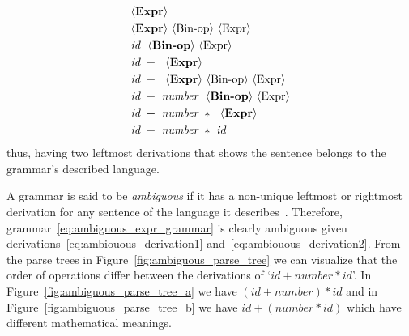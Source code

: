 \documentclass[
  oneside,
  english,
  coorientadorbanca,
  embeddedlogo,
  noabntexcite
]{ufsc-thesis-rn46-2019}
\newcommand{\bnfvar}[1]{\ \bnfvars{#1}}
\newcommand{\bnfvars}[1]{\langle\textrm{#1}\rangle}
\begin{document}
\begin{equation}\label{eq:ambiouous_derivation2}
  \begin{aligned}
     & \bnfvars{\textbf{Expr}}                                                  \\
     & \bnfvars{\textbf{Expr}}\bnfvar{Bin-op}\bnfvar{Expr}                      \\
     & \textit{id}\ \bnfvar{\textbf{Bin-op}}\bnfvar{Expr}                       \\
     & \textit{id}\ + \ \bnfvar{\textbf{Expr}}                                  \\
     & \textit{id}\ + \ \bnfvar{\textbf{Expr}}\bnfvar{Bin-op}\bnfvar{Expr}      \\
     & \textit{id}\ + \ \textit{number} \ \bnfvar{\textbf{Bin-op}}\bnfvar{Expr} \\
     & \textit{id}\ + \ \textit{number} \ * \ \bnfvar{\textbf{Expr}}            \\
     & \textit{id}\ + \ \textit{number} \ * \ \textit{id}
  \end{aligned}
\end{equation}
thus, having two leftmost derivations that shows the sentence belongs to the grammar's described language.

A grammar is said to be \textit{ambiguous} if it has a non-unique leftmost or rightmost derivation for any sentence of the language it describes~\cite{Aho:2006:CPT:1177220}.
Therefore, grammar~\eqref{eq:ambiguous_expr_grammar} is clearly ambiguous given derivations~\eqref{eq:ambiouous_derivation1} and~\eqref{eq:ambiouous_derivation2}.
From the parse trees in Figure~\ref{fig:ambiguous_parse_tree} we can visualize that the order of operations differ between the derivations of `$id + number * id$'.
In Figure~\ref{fig:ambiguous_parse_tree_a} we have $(id + number) * id$ and in Figure~\ref{fig:ambiguous_parse_tree_b} we have $id + (number * id)$ which have different mathematical meanings.
\end{document}
